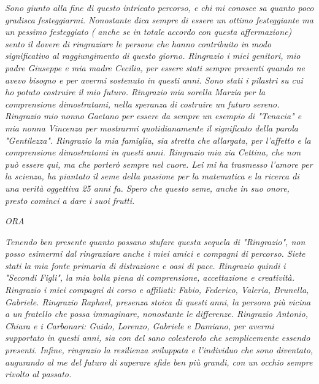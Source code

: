 \documentclass[12pt]{report}
\begin{document}
\begin{flushleft}
\emph{Sono giunto alla fine di questo intricato percorso, e chi mi conosce sa quanto poco gradisca festeggiarmi. Nonostante dica sempre di essere un ottimo festeggiante ma un pessimo festeggiato ( anche se in totale accordo con questa affermazione) sento il dovere di ringraziare le persone che hanno contribuito in modo significativo al raggiungimento di questo giorno.
Ringrazio i miei genitori, mio padre Giuseppe e mia madre Cecilia, per essere stati sempre presenti quando ne avevo bisogno e per avermi sostenuto in questi anni. Sono stati i pilastri su cui ho potuto costruire il mio futuro.
Ringrazio mia sorella Marzia per la comprensione dimostratami, nella speranza di costruire un futuro sereno.
Ringrazio mio nonno Gaetano per essere da sempre un esempio di "Tenacia" e mia nonna Vincenza per mostrarmi quotidianamente il significato della parola "Gentilezza".
Ringrazio la mia famiglia, sia stretta che allargata, per l'affetto e la comprensione dimostratomi in questi anni.
Ringrazio mia zia Cettina, che non può essere qui, ma che porterò sempre nel cuore. Lei mi ha trasmesso l'amore per la scienza, ha piantato il seme della passione per la matematica e la ricerca di una verità oggettiva 25 anni fa. Spero che questo seme, anche in suo onore, presto cominci a dare i suoi frutti.}

\emph{ORA}

\emph{
Tenendo ben presente quanto possano stufare questa sequela di "Ringrazio", non posso esimermi dal ringraziare anche i miei amici e compagni di percorso. Siete stati la mia fonte primaria di distrazione e oasi di pace.
Ringrazio quindi i "Secondi Figli", la mia bolla piena di comprensione, accettazione e creatività. 
Ringrazio i miei compagni di corso e affiliati: Fabio, Federico, Valeria, Brunella, Gabriele.
Ringrazio Raphael, presenza stoica di questi anni, la persona più vicina a un fratello che possa immaginare, nonostante le differenze.
Ringrazio Antonio, Chiara e i Carbonari: Guido, Lorenzo, Gabriele e Damiano, per avermi supportato in questi anni, sia con del sano colesterolo che semplicemente essendo presenti.
Infine, ringrazio la resilienza sviluppata e l'individuo che sono diventato, augurando al me del futuro di superare sfide ben più grandi, con un occhio sempre rivolto al passato.}
\end{flushleft}

\newpage

\tableofcontents
\thispagestyle{empty}
\end{document}

